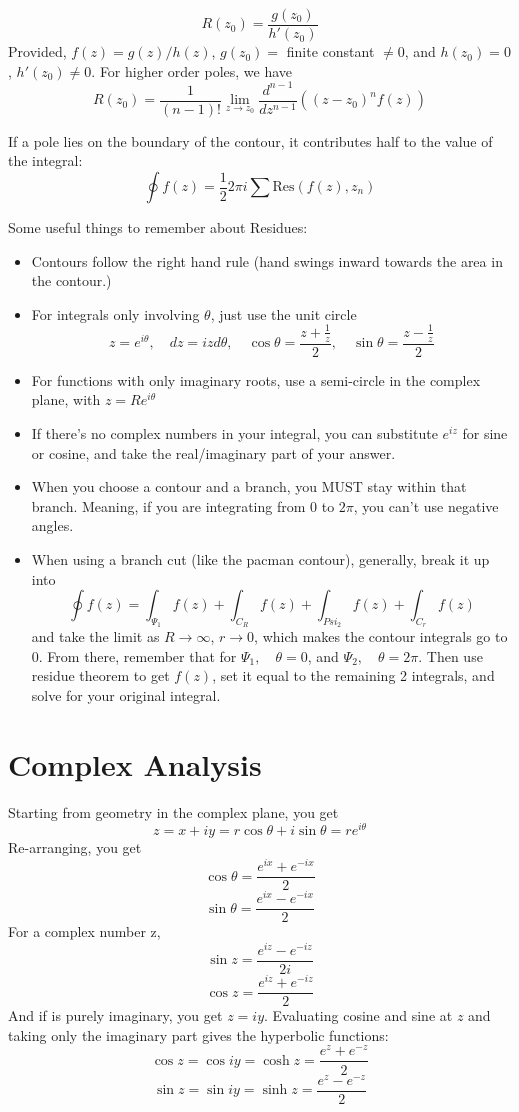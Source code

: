 \documentclass{article}
\begin{document}
$$
R(z_0) = \frac{g(z_0)}{h'(z_0)}
$$
Provided, $f(z) = g(z)/h(z)$, $g(z_0) = $ finite constant $\neq 0$, and $h(z_0) = 0$, $h'(z_0) \neq 0$.  For higher order poles, we have
$$
R(z_0) = \frac{1}{(n-1)!} \lim_{z \to z_0} \frac{d^{n-1}}{dz^{n-1}}\left( (z-z_0)^n f(z) \right)
$$

If a pole lies on the boundary of the contour, it contributes half to the value of the integral:
$$
\oint f(z) = \frac{1}{2} 2\pi i\sum \text{Res}(f(z), z_n)
$$

Some useful things to remember about Residues:
\begin{itemize}
    \item Contours follow the right hand rule (hand swings inward towards the area in the contour.)
    \item For integrals only involving $\theta$, just use the unit circle 
    $$
    z = e^{i\theta}, \quad dz = izd\theta, \quad \cos\theta = \frac{z + \frac{1}{z}}{2}, \quad \sin\theta = \frac{z - \frac{1}{z}}{2}
    $$
    \item For functions with only imaginary roots, use a semi-circle in the complex plane, with $z = Re^{i\theta}$
    \item If there's no complex numbers in your integral, you can substitute $e^{iz}$ for sine or cosine, and take the real/imaginary part of your answer.
    \item When you choose a contour and a branch, you MUST stay within that branch.  Meaning, if you are integrating from $0$ to $2\pi$, you can't use negative angles.  
    \item When using a branch cut (like the pacman contour), generally, break it up into
    $$
    \oint f(z) = \int_{\Psi_1} f(z) + \int_{C_R} f(z) + \int_{Psi_{2}} f(z) + \int_{C_r} f(z)
    $$
    and take the limit as $R \to \infty$, $r \to 0$, which makes the contour integrals go to 0. From there, remember that for $\Psi_1,\quad \theta = 0$, and $\Psi_{2}, \quad \theta = 2\pi$.  Then use residue theorem to get $f(z)$, set it equal to the remaining 2 integrals, and solve for your original integral.
    
\end{itemize}


\section{Complex Analysis}
Starting from geometry in the complex plane, you get
$$
z = x + iy = r\cos\theta + i\sin\theta = re^{i\theta}
$$
Re-arranging, you get
$$
\cos\theta = \frac{e^{ix} + e^{-ix}}{2}
$$
$$
\sin\theta = \frac{e^{ix} - e^{-ix}}{2}
$$
For a complex number z,
$$
\sin z = \frac{e^{iz} - e^{-iz}}{2i}
$$
$$
\cos z = \frac{e^{iz} + e^{-iz}}{2}
$$
And if is purely imaginary, you get $z=iy$.  Evaluating cosine and sine at $z$ and taking only the imaginary part gives the hyperbolic functions:
$$
\cos z = \cos iy = \cosh z = \frac{e^z + e^{-z}}{2}
$$
$$
\sin z = \sin iy = \sinh z = \frac{e^z - e^{-z}}{2}
$$
\end{document}

